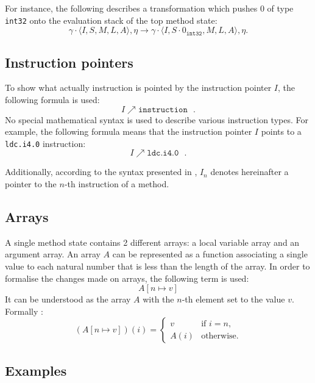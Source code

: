 \documentclass{article}
\numberwithin{equation}{section}
\newcommand{\mstate}[5] {
	\langle#1, #2, #3, #4, #5\rangle
}
\newcommand{\ipointsto}[3] {
	#1 \nearrow \texttt{#2} \text{ } #3
}
\newcommand{\setarrayitem}[3] {
	#1[#2 \mapsto #3]
}
\begin{document}
For instance, the following describes a transformation which pushes 0 of type \texttt{int32} onto the evaluation stack of the top method state:
$$
	\gamma \cdot \mstate{I}{S}{M}{L}{A}, \eta \rightarrow \gamma \cdot \mstate{I}{S \cdot 0_\texttt{int32}}{M}{L}{A}, \eta.
$$

\subsection{Instruction pointers}

To show what actually instruction is pointed by the instruction pointer $I$, the following formula is used:
\begin{equation}
	\ipointsto{I}{instruction}.
\end{equation}
No special mathematical syntax is used to describe various instruction types. For example, the following formula means that the instruction pointer $I$ points to a \texttt{ldc.i4.0} instruction:
$$
	\ipointsto{I}{ldc.i4.0}.
$$

Additionally, according to the syntax presented in \cite{zychlaThesis}, $I_n$ denotes hereinafter a pointer to the $n$-th instruction of a method.

\subsection{Arrays}

A single method state contains 2 different arrays: a local variable array and an argument array. An array $A$ can be represented as a function associating a single value to each natural number that is less than the length of the array. In order to formalise the changes made on arrays, the following term is used:
\begin{equation}
\label{eq:array_change}
	\setarrayitem{A}{n}{v}
\end{equation}
It can be understood as the array $A$ with the $n$-th element set to the value $v$. Formally \cite{zychlaThesis}:
\begin{equation}
\label{eq:array_change_formal}
	(\setarrayitem{A}{n}{v})(i) =
	\begin{cases}
		v		& \text{if } i = n,\\
		A(i)	& \text{otherwise.}
	\end{cases}
\end{equation}


\subsection{Examples}
\end{document}
